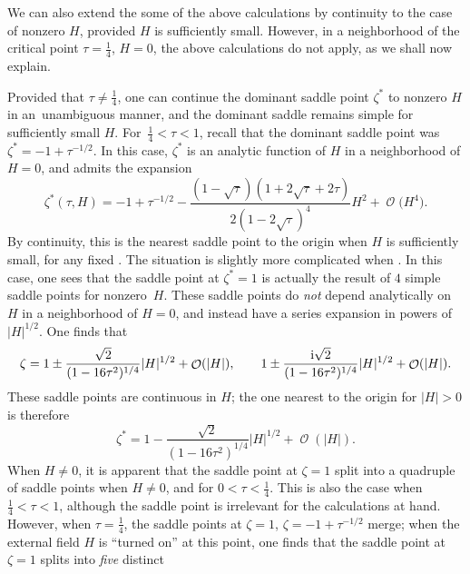 \documentclass[10pt,a4paper]{amsart}
\DeclareMathOperator{\OO}{\mathcal{O}}
\numberwithin{equation}{section}
\begin{document}
\begin{Remark}
 We can also extend the some of the above calculations by continuity to the case of nonzero $H$, provided $H$ is sufficiently small. However, in a neighborhood of the critical point $\tau=\frac{1}{4}$, $H=0$, the above calculations do not apply, as we shall now explain.

 Provided that $\tau\neq \frac{1}{4}$, one can continue the dominant saddle point $\zeta^*$ to nonzero $H$ in an~unambiguous manner, and the dominant saddle remains simple for sufficiently small $H$. For~${\frac{1}{4}< \tau < 1}$,
 recall that the dominant saddle point was $\zeta^* = -1 + \tau^{-1/2}$. In this case, $\zeta^*$ is an analytic function of $H$ in a neighborhood of $H=0$, and admits the expansion
 \begin{equation*}
 \zeta^*(\tau,H) = -1 + \tau^{-1/2} - \frac{(1-\sqrt{\tau})(1+2\sqrt{\tau}+2\tau)}{2(1-2\sqrt{\tau})^4}H^2 + \OO\bigl(H^4\bigr).
 \end{equation*}
 By continuity, this is the nearest saddle point to the origin when $H$ is sufficiently small, for any fixed .
 The situation is slightly more complicated when . In this case, one sees that the saddle point at $\zeta^* = 1$ is actually the result of $4$ simple saddle points for nonzero~$H$. These saddle points do \textit{not} depend analytically on $H$ in a neighborhood of $H=0$, and instead have a series expansion in powers of $|H|^{1/2}$. One finds that
 \begin{equation*}
 \zeta = 1 \pm \frac{\sqrt{2}}{(1-16\tau^2)^{1/4}}|H|^{1/2} + \OO(|H|),\qquad 1 \pm \frac{{\rm i}\sqrt{2}}{(1-16\tau^2)^{1/4}}|H|^{1/2} + \OO(|H|).
 \end{equation*}
 These saddle points are continuous in $H$; the one nearest to the origin for $|H|>0$ is therefore
 \begin{equation*}
 \zeta^* = 1-\frac{\sqrt{2}}{(1-16\tau^2)^{1/4}}|H|^{1/2} + \OO(|H|).
 \end{equation*}
 When $H\neq 0$, it is apparent that the saddle point at $\zeta = 1$ split into a quadruple of saddle points when $H\neq 0$,
 and for $0 < \tau < \frac{1}{4}$. This is also the case when $\frac{1}{4} < \tau < 1$, although the saddle point is irrelevant for the
 calculations at hand. However, when $\tau = \frac{1}{4}$, the saddle points at $\zeta = 1$, $\zeta = -1 + \tau^{-1/2}$ merge; when the
 external field $H$ is ``turned on'' at this point, one finds that the saddle point at $\zeta= 1$ splits into \textit{five} distinct

\end{Remark}
\end{document}
